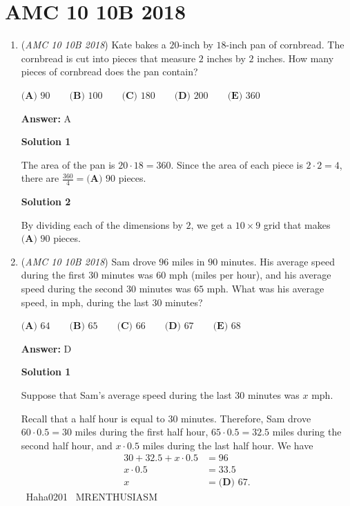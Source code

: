 \section{AMC 10 10B 2018}
        \begin{enumerate}
        	\item (\textit{AMC 10 10B 2018}) Kate bakes a $20$-inch by $18$-inch pan of cornbread. The cornbread is cut into pieces that measure $2$ inches by $2$ inches. How many pieces of cornbread does the pan contain?


 $\textbf{(A) } 90 \qquad \textbf{(B) } 100 \qquad \textbf{(C) } 180 \qquad \textbf{(D) } 200 \qquad \textbf{(E) } 360$

 \textbf{Answer: }A



\textbf{Solution 1}

The area of the pan is $20\cdot18=360$. Since the area of each piece is $2\cdot2=4$, there are $\frac{360}{4} = \boxed{\textbf{(A) } 90}$ pieces.

 



\textbf{Solution 2}

By dividing each of the dimensions by $2$, we get a $10\times9$ grid that makes $\boxed{\textbf{(A) } 90}$ pieces.

 


	\item (\textit{AMC 10 10B 2018}) Sam drove $96$ miles in $90$ minutes. His average speed during the first $30$ minutes was $60$ mph (miles per hour), and his average speed during the second $30$ minutes was $65$ mph. What was his average speed, in mph, during the last $30$ minutes?


 $\textbf{(A) } 64 \qquad \textbf{(B) } 65 \qquad \textbf{(C) } 66 \qquad \textbf{(D) } 67 \qquad \textbf{(E) } 68$

 \textbf{Answer: }D



\textbf{Solution 1}

Suppose that Sam's average speed during the last $30$ minutes was $x$ mph.

 Recall that a half hour is equal to $30$ minutes. Therefore, Sam drove $60\cdot0.5=30$ miles during the first half hour, $65\cdot0.5=32.5$ miles during the second half hour, and $x\cdot0.5$ miles during the last half hour. We have 
 \begin{align*} 30+32.5+x\cdot0.5&=96 \\ x\cdot0.5&=33.5 \\ x&=\boxed{\textbf{(D) } 67}. \end{align*}
~Haha0201 ~MRENTHUSIASM


\end{enumerate}
